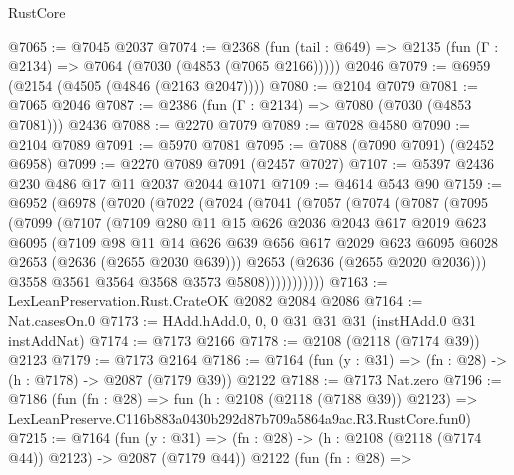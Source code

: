 \begin{lexlean}{RustCore}
\begin{coremodule}
@7065 := @7045 @2037
@7074 := @2368
    (fun (tail : @649) => @2135 (fun (Γ : @2134) => @7064 (@7030 (@4853 (@7065 @2166)))))
    @2046
@7079 := @6959 (@2154 (@4505 (@4846 (@2163 @2047))))
@7080 := @2104 @7079
@7081 := @7065 @2046
@7087 := @2386 (fun (Γ : @2134) => @7080 (@7030 (@4853 @7081))) @2436
@7088 := @2270 @7079
@7089 := @7028 @4580
@7090 := @2104 @7089
@7091 := @5970 @7081
@7095 := @7088 (@7090 @7091) (@2452 @6958)
@7099 := @2270 @7089 @7091 (@2457 @7027)
@7107 := @5397 @2436 @230 @486 @17 @11 @2037 @2044 @1071
@7109 := @4614 @543 @90
@7159 := @6952
    (@6978
      (@7020
        (@7022
          (@7024
            (@7041
              (@7057
                (@7074
                  (@7087
                    (@7095
                      (@7099
                        (@7107
                          (@7109
                            @280
                            @11
                            @15
                            @626
                            @2036
                            @2043
                            @617
                            @2019
                            @623
                            @6095
                            (@7109
                              @98
                              @11
                              @14
                              @626
                              @639
                              @656
                              @617
                              @2029
                              @623
                              @6095
                              @6028
                              @2653
                              (@2636 (@2655 @2030 @639)))
                            @2653
                            (@2636 (@2655 @2020 @2036)))
                          @3558
                          @3561
                          @3564
                          @3568
                          @3573
                          @5808)))))))))))
@7163 := LexLeanPreservation.Rust.CrateOK @2082 @2084 @2086
@7164 := Nat.casesOn.{0}
@7173 := HAdd.hAdd.{0, 0, 0} @31 @31 @31 (instHAdd.{0} @31 instAddNat)
@7174 := @7173 @2166
@7178 := @2108 (@2118 (@7174 @39)) @2123
@7179 := @7173 @2164
@7186 := @7164 (fun (y : @31) => (fn : @28) -> (h : @7178) -> @2087 (@7179 @39)) @2122
@7188 := @7173 Nat.zero
@7196 := @7186
    (fun (fn : @28) =>
    fun (h : @2108 (@2118 (@7188 @39)) @2123) =>
    LexLeanPreserve.C116b883a0430b292d87b709a5864a9ac.R3.RustCore.fun0)
@7215 := @7164
    (fun (y : @31) => (fn : @28) -> (h : @2108 (@2118 (@7174 @44)) @2123) -> @2087 (@7179 @44))
    @2122
    (fun (fn : @28) =>

\end{coremodule}
\end{lexlean}
